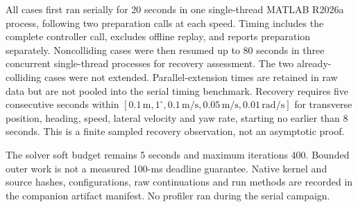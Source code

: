 \documentclass[10pt]{article}
\begin{document}
All cases first ran serially for 20 seconds in one single-thread MATLAB R2026a process, following two preparation calls at each speed. Timing includes the complete controller call, excludes offline replay, and reports preparation separately. Noncolliding cases were then resumed up to 80 seconds in three concurrent single-thread processes for recovery assessment. The two already-colliding cases were not extended. Parallel-extension times are retained in raw data but are not pooled into the serial timing benchmark. Recovery requires five consecutive seconds within $[0.1\,\mathrm m,1^\circ,0.1\,\mathrm{m/s},0.05\,\mathrm{m/s},0.01\,\mathrm{rad/s}]$ for transverse position, heading, speed, lateral velocity and yaw rate, starting no earlier than 8 seconds. This is a finite sampled recovery observation, not an asymptotic proof.

The solver soft budget remains 5 seconds and maximum iterations 400. Bounded outer work is not a measured 100-ms deadline guarantee. Native kernel and source hashes, configurations, raw continuations and run methods are recorded in the companion artifact manifest. No profiler ran during the serial campaign.
\end{document}
